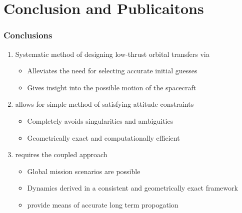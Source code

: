 

\section[Conclusion]{Conclusion and Publicaitons}


\begin{frame} %
\frametitle{Conclusions}
  \begin{enumerate}
    \item<1-> Systematic method of designing low-thrust orbital transfers via 
    \begin{itemize}
        \item Alleviates the need for selecting accurate initial guesses 
        \item Gives insight into the possible motion of the spacecraft
    \end{itemize}
    \item<2->  allows for simple method of satisfying attitude constraints
    \begin{itemize}
        \item Completely avoids singularities and ambiguities
        \item Geometrically exact and computationally efficient
    \end{itemize}
    \item<3->  requires the coupled approach 
    \begin{itemize}
        \item Global mission scenarios are possible
        \item Dynamics derived in a consistent and geometrically exact framework
        \item {} provide means of accurate long term propogation
    \end{itemize}

  \end{enumerate}
\end{frame}   %

